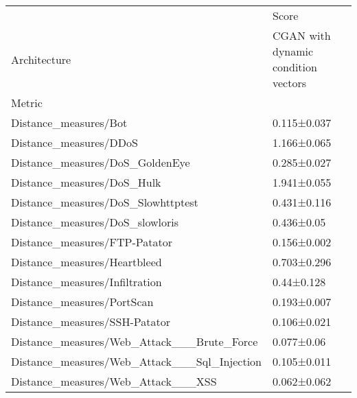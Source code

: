 \begin{tabular}{ll}
\toprule
{} &                               Score \\
Architecture & CGAN with dynamic condition vectors \\
Metric                                       &                                     \\
\midrule
Distance\_measures/Bot                        &                         0.115±0.037 \\
Distance\_measures/DDoS                       &                         1.166±0.065 \\
Distance\_measures/DoS\_GoldenEye              &                         0.285±0.027 \\
Distance\_measures/DoS\_Hulk                   &                         1.941±0.055 \\
Distance\_measures/DoS\_Slowhttptest           &                         0.431±0.116 \\
Distance\_measures/DoS\_slowloris              &                          0.436±0.05 \\
Distance\_measures/FTP-Patator                &                         0.156±0.002 \\
Distance\_measures/Heartbleed                 &                         0.703±0.296 \\
Distance\_measures/Infiltration               &                          0.44±0.128 \\
Distance\_measures/PortScan                   &                         0.193±0.007 \\
Distance\_measures/SSH-Patator                &                         0.106±0.021 \\
Distance\_measures/Web\_Attack\_\_\_Brute\_Force   &                          0.077±0.06 \\
Distance\_measures/Web\_Attack\_\_\_Sql\_Injection &                         0.105±0.011 \\
Distance\_measures/Web\_Attack\_\_\_XSS           &                         0.062±0.062 \\
\bottomrule
\end{tabular}
